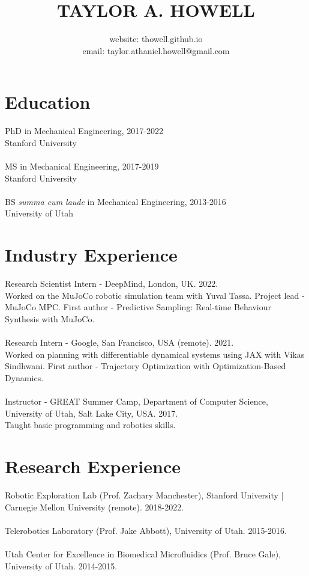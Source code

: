 \documentclass[10pt]{article}
\title{TAYLOR A. HOWELL}
\author{
website: thowell.github.io\\
email: taylor.athaniel.howell@gmail.com
}
\date{}
\begin{document}
\maketitle

\section*{Education}
PhD in Mechanical Engineering, 2017-2022\\
Stanford University
\\
\\
MS in Mechanical Engineering, 2017-2019\\
Stanford University
\\
\\
BS \textit{summa cum laude} in Mechanical Engineering, 2013-2016\\
University of Utah

\section*{Industry Experience}
Research Scientist Intern - DeepMind, London, UK. 2022. \\
Worked on the MuJoCo robotic simulation team with Yuval Tassa. 
Project lead - MuJoCo MPC. 
First author - Predictive Sampling: Real-time Behaviour Synthesis with MuJoCo.
\\
\\ 
Research Intern - Google, San Francisco, USA (remote). 2021. \\
Worked on planning with differentiable dynamical systems using JAX with Vikas Sindhwani. 
First author - Trajectory Optimization with Optimization-Based Dynamics.
\\
\\
Instructor - GREAT Summer Camp, Department of Computer Science, University of Utah, Salt Lake City, USA. 2017. \\
Taught basic programming and robotics skills.

\section*{Research Experience}
Robotic Exploration Lab (Prof. Zachary Manchester), Stanford University | Carnegie Mellon University (remote). 2018-2022.
\\
\\
Telerobotics Laboratory (Prof. Jake Abbott), University of Utah. 2015-2016.
\\
\\
Utah Center for Excellence in Biomedical Microfluidics (Prof. Bruce Gale), University of Utah. 2014-2015.
\end{document}
